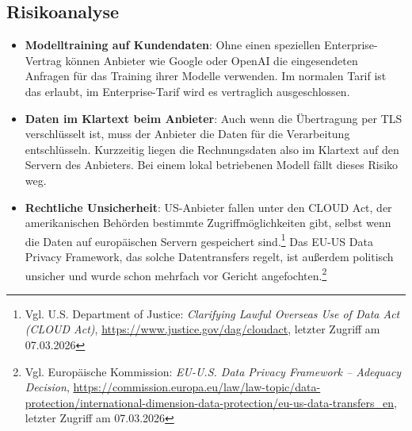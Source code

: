 \subsection{Risikoanalyse}
\begin{itemize}
    \item \textbf{Modelltraining auf Kundendaten}: Ohne einen speziellen Enterprise-Vertrag können Anbieter wie Google oder OpenAI die eingesendeten Anfragen für das Training ihrer Modelle verwenden. Im normalen Tarif ist das erlaubt, im Enterprise-Tarif wird es vertraglich ausgeschlossen.
    \item \textbf{Daten im Klartext beim Anbieter}: Auch wenn die Übertragung per TLS verschlüsselt ist, muss der Anbieter die Daten für die Verarbeitung entschlüsseln. Kurzzeitig liegen die Rechnungsdaten also im Klartext auf den Servern des Anbieters. Bei einem lokal betriebenen Modell fällt dieses Risiko weg.
    \item \textbf{Rechtliche Unsicherheit}: US-Anbieter fallen unter den CLOUD Act, der amerikanischen Behörden bestimmte Zugriffmöglichkeiten gibt, selbst wenn die Daten auf europäischen Servern gespeichert sind.\footnote{Vgl. U.S. Department of Justice: \textit{Clarifying Lawful Overseas Use of Data Act (CLOUD Act)}, \url{https://www.justice.gov/dag/cloudact}, letzter Zugriff am 07.03.2026} Das EU-US Data Privacy Framework, das solche Datentransfers regelt, ist außerdem politisch unsicher und wurde schon mehrfach vor Gericht angefochten.\footnote{Vgl. Europäische Kommission: \textit{EU-U.S. Data Privacy Framework -- Adequacy Decision}, \url{https://commission.europa.eu/law/law-topic/data-protection/international-dimension-data-protection/eu-us-data-transfers_en}, letzter Zugriff am 07.03.2026}
\end{itemize}

